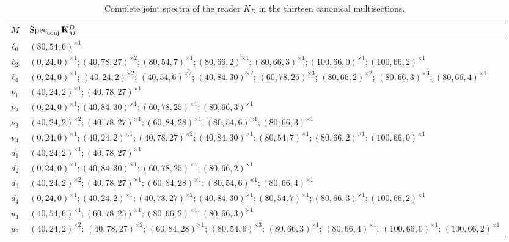 \begingroup\footnotesize
\begin{longtable}{@{}c p{}@{}}
\caption{Complete joint spectra of the reader \(K_D\) in the thirteen
canonical multisections.}
\\
\toprule
\(M\)&\(\operatorname{Spec}_{\rm conj}\mathbf K_M^D\)\\
\midrule
\endhead
\(\ell_0\)&\((80,54,6)^{\times1}\)\\
\(\ell_2\)&\((0,24,0)^{\times1};(40,78,27)^{\times2};(80,54,7)^{\times1};(80,66,2)^{\times1};(80,66,3)^{\times1};(100,66,0)^{\times1};(100,66,2)^{\times1}\)\\
\(\ell_4\)&\((0,24,0)^{\times1}\); \((40,24,2)^{\times2}\); \((40,54,6)^{\times2}\); \((40,84,30)^{\times2}\); \((60,78,25)^{\times3}\); \((80,66,2)^{\times2}\); \((80,66,3)^{\times3}\); \((80,66,4)^{\times1}\)\\
\(\nu_1\)&\((40,24,2)^{\times1};(40,78,27)^{\times1}\)\\
\(\nu_2\)&\((0,24,0)^{\times1};(40,84,30)^{\times1};(60,78,25)^{\times1};(80,66,3)^{\times1}\)\\
\(\nu_3\)&\((40,24,2)^{\times2};(40,78,27)^{\times1};(60,84,28)^{\times1};(80,54,6)^{\times1};(80,66,3)^{\times1}\)\\
\(\nu_4\)&\((0,24,0)^{\times1};(40,24,2)^{\times1};(40,78,27)^{\times2};(40,84,30)^{\times1};(80,54,7)^{\times1};(80,66,2)^{\times1};(100,66,0)^{\times1}\)\\
\(d_1\)&\((40,24,2)^{\times1};(40,78,27)^{\times1}\)\\
\(d_2\)&\((0,24,0)^{\times1};(40,84,30)^{\times1};(60,78,25)^{\times1};(80,66,2)^{\times1}\)\\
\(d_3\)&\((40,24,2)^{\times2};(40,78,27)^{\times1};(60,84,28)^{\times1};(80,54,6)^{\times1};(80,66,4)^{\times1}\)\\
\(d_4\)&\((0,24,0)^{\times1};(40,24,2)^{\times1};(40,78,27)^{\times2};(40,84,30)^{\times1};(80,54,7)^{\times1};(80,66,3)^{\times1};(100,66,2)^{\times1}\)\\
\(u_1\)&\((40,54,6)^{\times1};(60,78,25)^{\times1};(80,66,2)^{\times1};(80,66,3)^{\times1}\)\\
\(u_3\)&\((40,24,2)^{\times2}\); \((40,78,27)^{\times2}\); \((60,84,28)^{\times1}\); \((80,54,6)^{\times3}\); \((80,66,3)^{\times1}\); \((80,66,4)^{\times1}\); \((100,66,0)^{\times1}\); \((100,66,2)^{\times1}\)\\
\bottomrule
\end{longtable}
\label{tab:espectros-kd-multisecciones-rev11}
\endgroup


